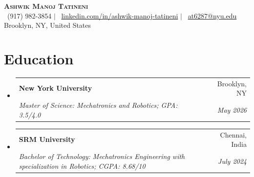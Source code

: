 \documentclass[a4paper,10pt]{article}
\makeatletter
\newcommand{\resumeSubheading}[4]{
  \vspace{-1pt}\item
    \begin{tabular*}{0.97\textwidth}[t]{l@{\extracolsep{\fill}}r}
      \textbf{#1} & #2 \\
      \textit{\small#3} & \textit{\small #4} \\
    \end{tabular*}\vspace{-5pt}
}
\makeatother
\begin{document}
\begin{center}
    \textbf{\Huge \scshape Ashwik Manoj Tatineni} \\ \vspace{5pt}
    \small 
    \faPhone\ (917) 982-3854 $|$ 
    \faLinkedin\ \href{https://linkedin.com/in/ashwik-manoj-tatineni}{linkedin.com/in/ashwik-manoj-tatineni} $|$ 
    \faEnvelope\ \href{mailto:at6287@nyu.edu}{at6287@nyu.edu} \\
    Brooklyn, NY, United States
\end{center}


\section{Education}
  \begin{itemize}[leftmargin=0.15in, label={}]
    \resumeSubheading
      {New York University}{Brooklyn, NY}
      {Master of Science: Mechatronics and Robotics; GPA: 3.5/4.0}{May 2026}
    \resumeSubheading
      {SRM University}{Chennai, India}
      {Bachelor of Technology: Mechatronics Engineering with specialization in Robotics; CGPA: 8.68/10}{July 2024}
  \end{itemize}


\end{document}
